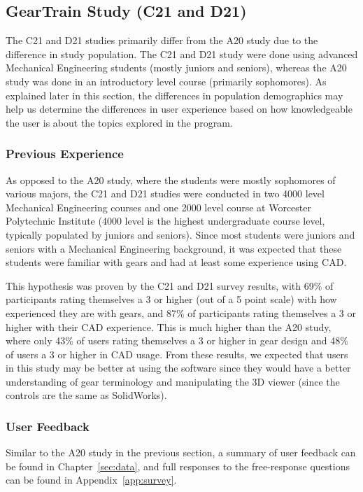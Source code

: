 \begin{doublespace}
\subsection{GearTrain Study (C21 and D21)}
The C21 and D21 studies primarily differ from the A20 study due to the difference in study population. The C21 and D21 study were done using advanced Mechanical Engineering students (mostly juniors and seniors), whereas the A20 study was done in an introductory level course (primarily sophomores). As explained later in this section, the differences in population demographics may help us determine the differences in user experience based on how knowledgeable the user is about the topics explored in the program.

\subsubsection{Previous Experience}
As opposed to the A20 study, where the students were mostly sophomores of various majors, the C21 and D21 studies were conducted in two 4000 level Mechanical Engineering courses and one 2000 level course at Worcester Polytechnic Institute (4000 level is the highest undergraduate course level, typically populated by juniors and seniors). Since most students were juniors and seniors with a Mechanical Engineering background, it was expected that these students were familiar with gears and had at least some experience using CAD. 

This hypothesis was proven by the C21 and D21 survey results, with 69\% of participants rating themselves a 3 or higher (out of a 5 point scale) with how experienced they are with gears, and 87\% of participants rating themselves a 3 or higher with their CAD experience. This is much higher than the A20 study, where only 43\% of users rating themselves a 3 or higher in gear design and 48\% of users a 3 or higher in CAD usage. From these results, we expected that users in this study may be better at using the software since they would have a better understanding of gear terminology and manipulating the 3D viewer (since the controls are the same as SolidWorks).

\subsubsection{User Feedback}
Similar to the A20 study in the previous section, a summary of user feedback can be found in Chapter~\ref{sec:data}, and full responses to the free-response questions can be found in Appendix~\ref{app:survey}.


\end{doublespace}
